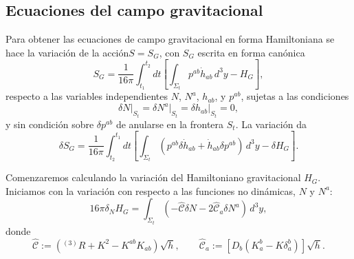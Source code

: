
\subsection{Ecuaciones del campo gravitacional}

Para obtener las ecuaciones de campo gravitacional en forma Hamiltoniana se hace la variaci\'{o}n de la acci\'{o}n\footnotemark $S = S_{G}$, con $S_{G}$ escrita en forma can\'{o}nica
%
\begin{equation}
S_{G} = \frac{1}{16 \pi} \int^{t_2}_{t_1} dt \left[ \int_{\Sigma_{t}} p^{ab} \dot{h}_{ab} \, d^{3} y - H_{G} \right],
\end{equation}
%
respecto a las variables independientes $N$, $N^{a}$, $h_{ab}$, y $p^{ab}$, sujetas a las condiciones
%
\begin{equation}
\label{eq:boundcondh}
\delta N \Big|_{S_{t}} = \delta N^{a} \Big|_{S_{t}} = \delta h_{ab} \Big|_{S_{t}} = 0,
\end{equation}
%
y sin condici\'{o}n sobre $\delta p^{ab}$ de anularse en la frontera $S_{t}$. La variaci\'{o}n da
%
\begin{equation}
\label{eq:varSG31}
\delta S_{G} = \frac{1}{16 \pi} \int^{t_1}_{t_2} dt \left[ \int_{\Sigma_{t}} (p^{ab} \delta \dot{h}_{ab} + \dot{h}_{ab} \delta p^{ab}) \, d^{3} y - \delta H_{G} \right].
\end{equation}

Comenzaremos calculando la variaci\'{o}n del Hamiltoniano gravitacional $H_{G}$. Iniciamos con la variaci\'{o}n con respecto a las funciones no din\'{a}micas, $N$ y $N^{a}$:
%
\begin{equation}
\label{eq:varHcrNNa}
16 \pi \delta_{N} H_{G} = \int_{\Sigma_{t}} (- \hat{\mathcal{C}} \delta N - 2 \hat{\mathcal{C}}_{a} \delta N^{a}) \, d^{3} y,
\end{equation}
%
donde
%
\begin{equation}
\hat{\mathcal{C}} := (^{(3)}R + K^{2} - K^{ab} K_{ab}) \sqrt{h}, \qquad \hat{\mathcal{C}}_{a} := [D_{b} (K_{a}^{b} - K \delta_{a}^{b})] \sqrt{h}.
\end{equation}

